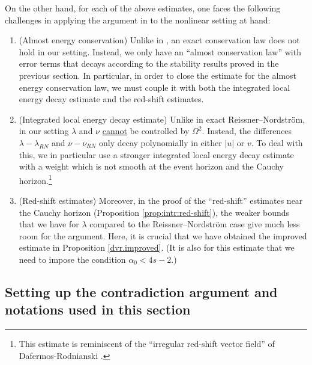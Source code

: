 \documentclass[10pt, reqno]{amsart}
\theoremstyle{definition}
\theoremstyle{remark}
\numberwithin{equation}{section}
\newcommand{\0}{\emptyset}
\newcommand{\Omg}{\Omega}
\begin{document}
On the other hand, for each of the above estimates, one faces the following challenges in applying the argument in \cite{LO.instab} to the nonlinear setting at hand:
\begin{enumerate}
\item (Almost energy conservation) Unlike in \cite{LO.instab}, an exact conservation law does not hold in our setting. Instead, we only have an ``almost conservation law'' with error terms that decays according to the stability results proved in the previous section. In particular, in order to close the estimate for the almost energy conservation law, we must couple it with both the integrated local energy decay estimate and the red-shift estimates.
\item (Integrated local energy decay estimate) Unlike in exact Reissner--Nordstr\"om, in our setting $\lambda$ and $\nu$ \underline{cannot} be controlled by $\Omg^2$. Instead, the differences $\lambda-\lambda_{RN}$ and $\nu-\nu_{RN}$ only decay polynomially in either $|u|$ or $v$. To deal with this, we in particular use a stronger integrated local energy decay estimate with a weight which is not smooth at the event horizon and the Cauchy horizon.\footnote{This estimate is reminiscent of the ``irregular red-shift vector field'' of Dafermos-Rodnianski \cite{DRS}. }
\item (Red-shift estimates) Moreover, in the proof of the ``red-shift'' estimates near the Cauchy horizon (Proposition \ref{prop:intr:red-shift}), the weaker bounds that we have for $\lambda$ compared to the Reissner--Nordstr\"om case give much less room for the argument. Here, it is crucial that we have obtained the improved estimate in Proposition \ref{dvr.improved}. (It is also for this estimate that we need to impose the condition $\alpha_0<4s-2$.)
\end{enumerate}

\subsection{Setting up the contradiction argument and notations used in this section}\label{sec.instab.setup}

\end{document}

